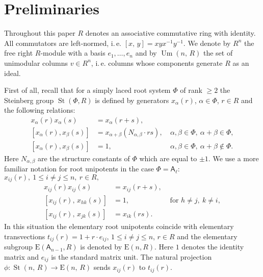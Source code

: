 \documentclass[11pt]{amsart}
\theoremstyle{plain} \declaretheorem[name=Theorem, Refname={Theorem,Theorems}]{tm} \Crefname{tm}{Theorem}{Theorems}
\numberwithin{equation}{section}
\theoremstyle{definition} \newtheorem{df}[lm]{Definition} \Crefname{df}{Definition}{Definitions}
\theoremstyle{remark} \newtheorem{rk}[lm]{Remark} \Crefname{rk}{Remark}{Remarks}
\newcommand{\E}{{\mathrm{E}}}
\newcommand{\Um}{\mathop{\mathrm{Um}}\nolimits}
\newcommand{\St}{\mathop{\mathrm{St}}\nolimits}
\newcommand{\inv}{^{-1}}
\newcommand{\rA}{\mathsf{A}}
\begin{document}
\section{Preliminaries} \label{sec:prelim}
Throughout this paper $R$ denotes an associative commutative ring with identity.
All commutators are left-normed, i.\,e. $[x,\,y]=xyx\inv y\inv$. 
We denote by $R^n$ the free right $R$-module with a basis $e_1,\ldots,e_n$ and by $\Um(n,\,R)$ the set of unimodular columns $v\in R^n$, i.\,e. 
columns whose components generate $R$ as an ideal.

First of all, recall that for a simply laced root system $\Phi$ of rank $\geq 2$ the Steinberg group $\St(\Phi, R)$ 
is defined by generators $x_\alpha(r)$, $\alpha\in\Phi$, $r\in R$ and the following relations:
\begin{align}
 x_\alpha(r) x_\alpha(s) & = x_\alpha(r+s), & \nonumber \\
 [x_\alpha(r),  x_\beta(s)] & = x_{\alpha+\beta}(N_{\alpha,\beta}\cdot rs), &\ \alpha,\beta\in \Phi,\ \alpha+\beta\in\Phi, \nonumber \\
 [x_\alpha(r),  x_\beta(s)] & = 1, &\ \alpha,\beta\in \Phi,\ \alpha+\beta\not\in\Phi. \nonumber
\end{align}
Here $N_{\alpha,\beta}$ are the structure constants of $\Phi$ which are equal to $\pm 1$.
We use a more familiar notation for root unipotents in the case $\Phi=\rA_\ell$:
$x_{ij}(r),\ 1\leq i\neq j\leq n,\ r\in R,$
\setcounter{equation}{0}
\renewcommand{\theequation}{S\arabic{equation}}
\begin{align}
x_{ij}(r)x_{ij}(s)      & = x_{ij}(r+s),& \label{add0}\\
[x_{ij}(r),\,x_{hk}(s)] & = 1,& \text{ for }h\neq j,\ k\neq i, \label{ccf1}\\
[x_{ij}(r),\,x_{jk}(s)] & = x_{ik}(rs).& \label{ccf2}
\end{align}
In this situation the elementary root unipotents coincide with elementary transvections $t_{ij}(r)=1+r \cdot e_{ij}$, $1\leq i\neq j\leq n$, $r\in R$
and the elementary subgroup $\E(\rA_{n-1}, R)$ is denoted by $\E(n, R)$.
Here $1$ denotes the identity matrix and $e_{ij}$ is the standard matrix unit. 
The natural projection $\phi\colon\St(n,\,R)\rightarrow\E(n,\,R)$ sends $x_{ij}(r)$ to $t_{ij}(r)$.
\end{document}
